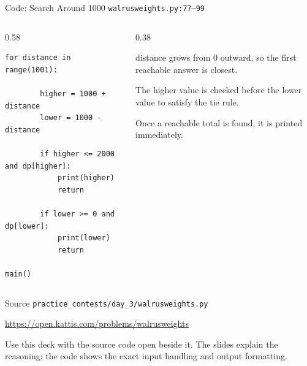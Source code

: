 \documentclass[aspectratio=169,11pt]{beamer}
\begin{document}
\begin{frame}[fragile]{Code: Search Around 1000}
\scriptsize
{} \texttt{walrusweights.py:77--99}

\vspace{0.08cm}
\begin{columns}[T,totalwidth=\textwidth]
\begin{column}{0.58\textwidth}
\begin{lstlisting}[style=cpcode]
    for distance in range(1001):

        higher = 1000 + distance
        lower = 1000 - distance

        if higher <= 2000 and dp[higher]:
            print(higher)
            return

        if lower >= 0 and dp[lower]:
            print(lower)
            return

main()
\end{lstlisting}
\end{column}
\begin{column}{0.38\textwidth}
\begin{tightitemize}
  \item distance grows from 0 outward, so the first reachable answer is closest.
  \item The higher value is checked before the lower value to satisfy the tie rule.
  \item Once a reachable total is found, it is printed immediately.
\end{tightitemize}
\end{column}
\end{columns}
\end{frame}

\begin{frame}{Source}
\small
{} \texttt{practice\_contests/day\_3/walrusweights.py}

\vspace{0.3cm}
 \url{https://open.kattis.com/problems/walrusweights}

\vspace{0.45cm}
Use this deck with the source code open beside it. The slides explain the reasoning; the code shows the exact input handling and output formatting.
\end{frame}
\end{document}
